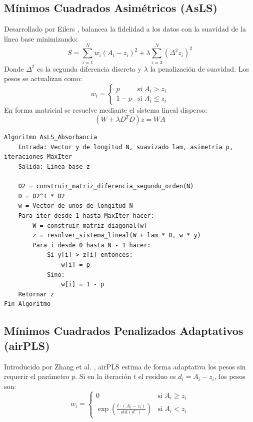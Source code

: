 \documentclass[a4paper,11pt]{article}
\begin{document}
\subsection{Mínimos Cuadrados Asimétricos (AsLS)}
Desarrollado por Eilers \cite{eilers2003}, balancea la fidelidad a los datos con la suavidad de la línea base minimizando:
\begin{equation}
    S = \sum_{i=1}^{N} w_i (A_i - z_i)^2 + \lambda \sum_{i=3}^{N} (\Delta^2 z_i)^2
\end{equation}
Donde $\Delta^2$ es la segunda diferencia discreta y $\lambda$ la penalización de suavidad. Los pesos se actualizan como:
\begin{equation}
    w_i = \begin{cases} p & \text{si } A_i > z_i \\ 1 - p & \text{si } A_i \le z_i \end{cases}
\end{equation}
En forma matricial se resuelve mediante el sistema lineal disperso:
\begin{equation}
    (W + \lambda D^T D) z = W A
\end{equation}

\begin{lstlisting}[caption=Algoritmo AsLS (Absorbancia)]
Algoritmo AsLS_Absorbancia
    Entrada: Vector y de longitud N, suavizado lam, asimetria p, iteraciones MaxIter
    Salida: Linea base z

    D2 = construir_matriz_diferencia_segundo_orden(N)
    D = D2^T * D2
    w = Vector de unos de longitud N
    Para iter desde 1 hasta MaxIter hacer:
        W = construir_matriz_diagonal(w)
        z = resolver_sistema_lineal(W + lam * D, w * y)
        Para i desde 0 hasta N - 1 hacer:
            Si y[i] > z[i] entonces:
                w[i] = p
            Sino:
                w[i] = 1 - p
    Retornar z
Fin Algoritmo
\end{lstlisting}

\subsection{Mínimos Cuadrados Penalizados Adaptativos (airPLS)}
Introducido por Zhang et al. \cite{zhang2010}, airPLS estima de forma adaptativa los pesos sin requerir el parámetro $p$. Si en la iteración $t$ el residuo es $d_i = A_i - z_i$, los pesos son:
\begin{equation}
    w_i = \begin{cases} 0 & \text{si } A_i \ge z_i \\ \exp\left( \frac{t \cdot (A_i - z_i)}{\text{std}(d^-)} \right) & \text{si } A_i < z_i \end{cases}
\end{equation}
\end{document}

